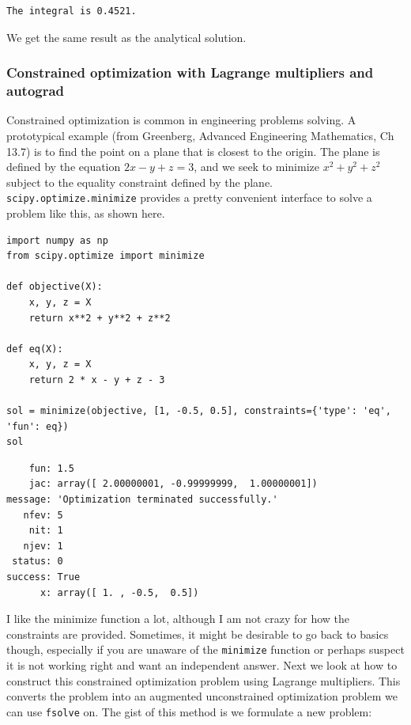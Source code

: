 \documentclass[11pt]{article}
\begin{document}
\begin{verbatim}
The integral is 0.4521.

\end{verbatim}

We get the same result as the analytical solution.
\subsubsection{Constrained optimization with Lagrange multipliers and autograd}
\label{sec:orgaf2ca5f}

Constrained optimization is common in engineering problems solving. A prototypical example (from Greenberg, Advanced Engineering Mathematics, Ch 13.7) is to find the point on a plane that is closest to the origin. The plane is defined by the equation \(2x - y + z = 3\), and we seek to minimize \(x^2 + y^2 + z^2\) subject to the equality constraint defined by the plane. \texttt{scipy.optimize.minimize} provides a pretty convenient interface to solve a problem like this, as shown here.

\begin{verbatim}
import numpy as np
from scipy.optimize import minimize

def objective(X):
    x, y, z = X
    return x**2 + y**2 + z**2

def eq(X):
    x, y, z = X
    return 2 * x - y + z - 3

sol = minimize(objective, [1, -0.5, 0.5], constraints={'type': 'eq', 'fun': eq})
sol
\end{verbatim}

\begin{verbatim}
    fun: 1.5
    jac: array([ 2.00000001, -0.99999999,  1.00000001])
message: 'Optimization terminated successfully.'
   nfev: 5
    nit: 1
   njev: 1
 status: 0
success: True
      x: array([ 1. , -0.5,  0.5])
\end{verbatim}

I like the minimize function a lot, although I am not crazy for how the constraints are provided.
Sometimes, it might be desirable to go back to basics though, especially if you are unaware of the \texttt{minimize} function or perhaps suspect it is not working right and want an independent answer. Next we look at how to construct this constrained optimization problem using Lagrange multipliers. This converts the problem into an augmented unconstrained optimization problem we can use \texttt{fsolve} on. The gist of this method is we formulate a new problem:
\end{document}
